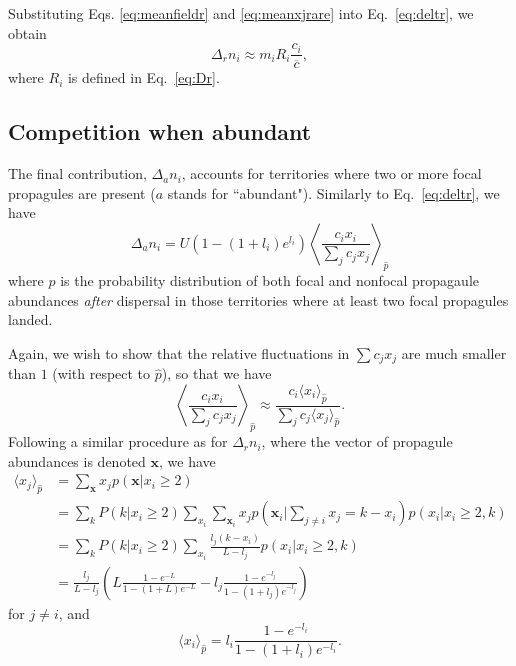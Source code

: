 \documentclass[11pt]{article}
\begin{document}
Substituting Eqs. \eqref{eq:meanfieldr} and \eqref{eq:meanxjrare} into Eq.~\eqref{eq:deltr}, we obtain
\begin{equation}
\Delta_r n_i\approx m_i R_i\frac{c_i}{\overline{c}}, \label{eq:deltrfinal}
\end{equation}
where $R_i$ is defined in Eq.~\eqref{eq:Dr}.

\subsection*{Competition when abundant}

The final contribution, $\Delta_a n_i$, accounts for territories where two or more focal propagules are present ($a$ stands for ``abundant"). Similarly to Eq.~\eqref{eq:deltr}, we have 
\begin{equation}
\Delta_a n_i=U(1-(1+l_i)e^{l_i})\left\langle \frac{c_i x_i}{\sum_j c_j x_j} \right\rangle_{\hat{p}}\label{eq:delta}
\end{equation}
where $\hat{p}$ is the probability distribution of both focal and nonfocal propagaule abundances \textit{after} dispersal in those territories where at least two focal propagules landed. 

Again, we wish to show that the relative fluctuations in $\sum c_j x_j$ are much smaller than $1$ (with respect to $\hat{p}$), so that we have 
\begin{equation}
\left\langle \frac{c_i x_i}{\sum_j c_j x_j} \right\rangle_{\hat{p}}\approx  \frac{c_i \langle x_i \rangle_{\hat{p}}}{\sum_j c_j \langle x_j\rangle_{\hat{p}}}.\label{eq:meanfielda}
\end{equation}
Following a similar procedure as for $\Delta_r n_i$, where the vector of propagule abundances is denoted ${\mathbf x}$, we have
\begin{align}
\langle x_j \rangle_{\hat{p}}&=\sum_{\mathbf x} x_j p(\mathbf x|x_i\geq 2)\nonumber \\
&=\sum_{k}P(k|x_i\geq 2)\sum_{x_i} \sum_{\mathbf x_i} x_j p(\mathbf x_i|\sum_{j\neq i} x_j=k-x_i)p(x_i|x_i\geq 2,k)\nonumber\\
&=\sum_{k}P(k|x_i\geq 2)\sum_{x_i} \frac{l_j(k-x_i)}{L-l_j} p(x_i|x_i\geq 2,k)\nonumber\\
&=\frac{l_j}{L-l_j}\left( L\frac{1-e^{-L}}{1-(1+L)e^{-L}}- l_j\frac{1-e^{-l_j}}{1-(1+l_j)e^{-l_j}}\right) 
\end{align}
for $j\neq i$, and 
\begin{equation}
\langle x_i\rangle_{\hat{p}}=l_i\frac{1-e^{-l_i}}{1-(1+l_i)e^{-l_i}}.
\end{equation}
\end{document}
